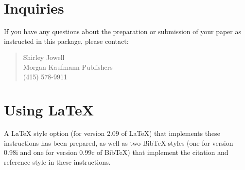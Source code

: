 \section{Inquiries}

If you have any questions about the preparation or submission of your
paper as instructed in this package, please contact:
\begin{quote}
Shirley Jowell \\
Morgan Kaufmann Publishers \\
(415) 578-9911
\end{quote}

\appendix

\section{Using \LaTeX{}}

A \LaTeX{} style option (for version 2.09 of \LaTeX{}) that implements these
instructions has been prepared, 
as well as
two Bib\TeX{} styles
(one for version 0.98i and one for version 0.99c of Bib\TeX{})
that implement the citation and reference style in
these instructions.


